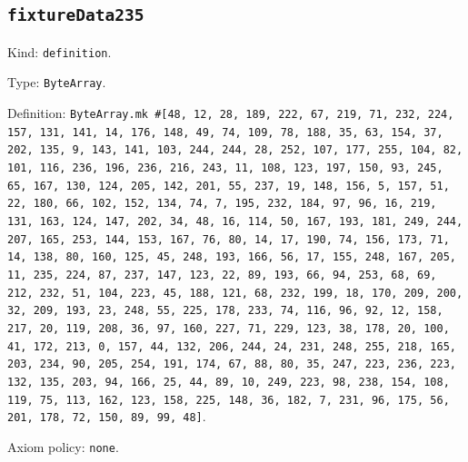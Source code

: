 \documentclass[11pt]{article}
\begin{document}
\subsection*{\texttt{fixtureData235}}
\noindent Kind: \texttt{definition}.\par
\noindent Type: \texttt{ByteArray}.\par
\noindent Definition: \texttt{ByteArray.mk \#[48, 12, 28, 189, 222, 67, 219, 71, 232, 224, 157, 131, 141, 14, 176, 148, 49, 74, 109, 78, 188, 35, 63, 154, 37, 202, 135, 9, 143, 141, 103, 244, 244, 28, 252, 107, 177, 255, 104, 82, 101, 116, 236, 196, 236, 216, 243, 11, 108, 123, 197, 150, 93, 245, 65, 167, 130, 124, 205, 142, 201, 55, 237, 19, 148, 156, 5, 157, 51, 22, 180, 66, 102, 152, 134, 74, 7, 195, 232, 184, 97, 96, 16, 219, 131, 163, 124, 147, 202, 34, 48, 16, 114, 50, 167, 193, 181, 249, 244, 207, 165, 253, 144, 153, 167, 76, 80, 14, 17, 190, 74, 156, 173, 71, 14, 138, 80, 160, 125, 45, 248, 193, 166, 56, 17, 155, 248, 167, 205, 11, 235, 224, 87, 237, 147, 123, 22, 89, 193, 66, 94, 253, 68, 69, 212, 232, 51, 104, 223, 45, 188, 121, 68, 232, 199, 18, 170, 209, 200, 32, 209, 193, 23, 248, 55, 225, 178, 233, 74, 116, 96, 92, 12, 158, 217, 20, 119, 208, 36, 97, 160, 227, 71, 229, 123, 38, 178, 20, 100, 41, 172, 213, 0, 157, 44, 132, 206, 244, 24, 231, 248, 255, 218, 165, 203, 234, 90, 205, 254, 191, 174, 67, 88, 80, 35, 247, 223, 236, 223, 132, 135, 203, 94, 166, 25, 44, 89, 10, 249, 223, 98, 238, 154, 108, 119, 75, 113, 162, 123, 158, 225, 148, 36, 182, 7, 231, 96, 175, 56, 201, 178, 72, 150, 89, 99, 48]}.\par
\noindent Axiom policy: \texttt{none}.\par
\end{document}
